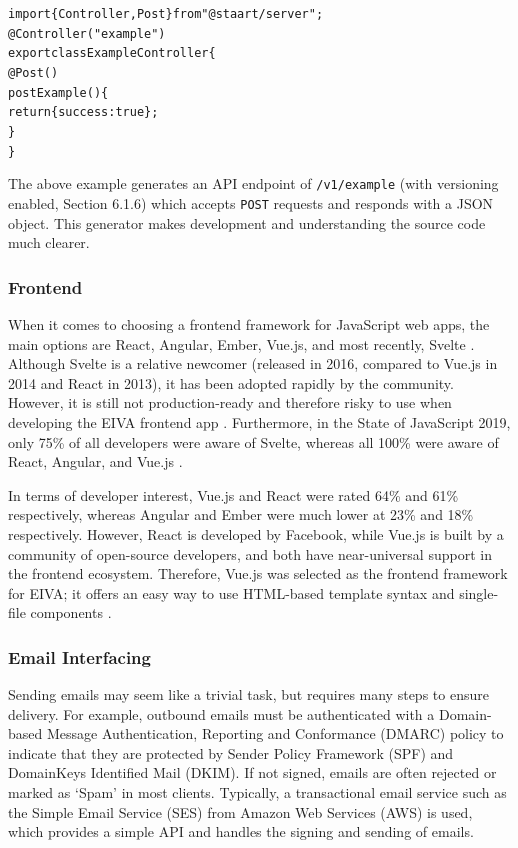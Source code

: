 \documentclass{article}
\begin{document}
\begin{alltt}
\textcolor{keyword}{import} \{ Controller, Post \} \textcolor{keyword}{from} \textcolor{string}{"@staart/server"};
@Controller(\textcolor{string}{"example"})
\textcolor{keyword}{export class} ExampleController \{
  @Post()
  \textcolor{variable}{postExample}() \{
    \textcolor{keyword}{return} \{ \textcolor{symbol}{success}: \textcolor{literal}{true} \};
  \}
\}
\end{alltt}

The above example generates an API endpoint of \texttt{/v1/example} (with versioning enabled, Section 6.1.6) which accepts \texttt{POST} requests and responds with a JSON object. This generator makes development and understanding the source code much clearer.

\subsubsection{Frontend}

When it comes to choosing a frontend framework for JavaScript web apps, the main options are React, Angular, Ember, Vue.js, and most recently, Svelte \cite{delcev_modern_2018}. Although Svelte is a relative newcomer (released in 2016, compared to Vue.js in 2014 and React in 2013), it has been adopted rapidly by the community. However, it is still not production-ready and therefore risky to use when developing the EIVA frontend app \cite{noauthor_svelte:_2019}. Furthermore, in the State of JavaScript 2019, only 75\% of all developers were aware of Svelte, whereas all 100\% were aware of React, Angular, and Vue.js \cite{noauthor_state_nodate}.

In terms of developer interest, Vue.js and React were rated 64\% and 61\% respectively, whereas Angular and Ember were much lower at 23\% and 18\% respectively. However, React is developed by Facebook, while Vue.js is built by a community of open-source developers, and both have near-universal support in the frontend ecosystem. Therefore, Vue.js was selected as the frontend framework for EIVA; it offers an easy way to use HTML-based template syntax and single-file components \cite{deng_development_2020}.

\subsubsection{Email Interfacing}

Sending emails may seem like a trivial task, but requires many steps to ensure delivery. For example, outbound emails must be authenticated with a Domain-based Message Authentication, Reporting and Conformance (DMARC) policy to indicate that they are protected by Sender Policy Framework (SPF) and DomainKeys Identified Mail (DKIM). If not signed, emails are often rejected or marked as `Spam' in most clients. Typically, a transactional email service such as the Simple Email Service (SES) from Amazon Web Services (AWS) is used, which provides a simple API and handles the signing and sending of emails.
\end{document}
